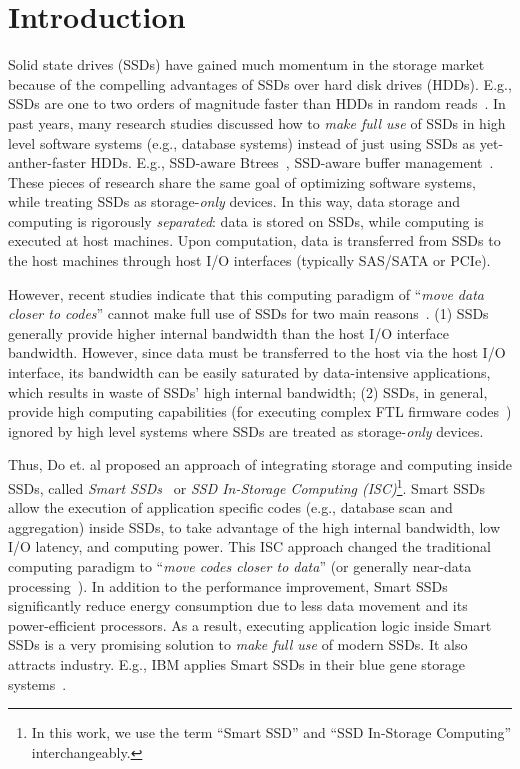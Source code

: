 
\section{Introduction}
Solid state drives (SSDs) have gained much momentum in the storage market because of the compelling advantages of SSDs over hard disk drives (HDDs). E.g., SSDs are one to two orders of magnitude faster than HDDs in random reads~\cite{AthanassoulisACGS10}. In past years, many research studies discussed how to \emph{make full use} of SSDs in high level software systems (e.g., database systems) instead of just using SSDs as yet-anther-faster HDDs.
E.g., SSD-aware Btrees~\cite{Li2010TIS}, SSD-aware buffer management~\cite{Do2011TDB}. These pieces of research share the same goal of optimizing software systems, while treating SSDs as storage-\emph{only} devices. In this way, data storage and computing is rigorously \emph{separated}: data is stored on SSDs, while computing is executed at host machines. Upon computation, data is transferred from SSDs to the host machines through host I/O interfaces (typically SAS/SATA or PCIe).

However, recent studies indicate that this computing paradigm of ``\emph{move data closer to codes}'' cannot make full use of SSDs for two main reasons~\cite{Do2013QPS,WoodsIA14}. (1) SSDs generally provide higher internal bandwidth than the host I/O interface bandwidth. However, since data must be transferred to the host via the host I/O interface, its bandwidth can be easily saturated by data-intensive applications, which results in waste of SSDs' high internal bandwidth; (2) SSDs, in general, provide high computing capabilities (for executing complex FTL firmware codes~\cite{Chung2009SFT}) ignored by high level systems where SSDs are treated as storage-\emph{only} devices.


Thus, Do et. al proposed an approach of integrating storage and computing inside SSDs, called \emph{Smart SSDs}~\cite{Do2013QPS} or \emph{SSD In-Storage Computing (ISC)}\footnote{\small In this work, we use the term ``Smart SSD'' and ``SSD In-Storage Computing'' interchangeably.}. Smart SSDs allow the execution of application specific codes (e.g., database scan and aggregation) inside SSDs, to take advantage of the high internal bandwidth, low I/O latency, and computing power. This ISC approach changed the traditional computing paradigm to ``\emph{move codes closer to data}'' (or generally near-data processing~\cite{Balasubramonian14}). In addition to the performance improvement, Smart SSDs significantly reduce energy consumption due to less data movement and its power-efficient processors. As a result, executing application logic inside Smart SSDs is a very promising solution to \emph{make full use} of modern SSDs. It also attracts industry. E.g., IBM applies Smart SSDs in their blue gene storage systems~\cite{Julich13}.


